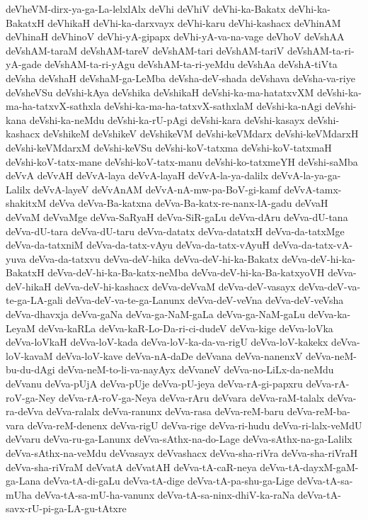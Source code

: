 {deVheVM-dirx-ya-ga-La-lelxlAlx
deVhi
deVhiV
deVhi-ka-Bakatx
deVhi-ka-BakatxH
deVhikaH
deVhi-ka-darxvayx
deVhi-karu
deVhi-kashacx
deVhinAM
deVhinaH
deVhinoV
deVhi-yA-gipapx
deVhi-yA-va-na-vage
deVhoV
deVshAA
deVshAM-taraM
deVshAM-tareV
deVshAM-tari
deVshAM-tariV
deVshAM-ta-ri-yA-gade
deVshAM-ta-ri-yAgu
deVshAM-ta-ri-yeMdu
deVshAa
deVshA-tiVta
deVsha
deVshaH
deVshaM-ga-LeMba
deVsha-deV-shada
deVshava
deVsha-va-riye
deVsheVSu
deVshi-kAya
deVshika
deVshikaH
deVshi-ka-ma-hatatxvXM
deVshi-ka-ma-ha-tatxvX-sathxla
deVshi-ka-ma-ha-tatxvX-sathxlaM
deVshi-ka-nAgi
deVshi-kana
deVshi-ka-neMdu
deVshi-ka-rU-pAgi
deVshi-kara
deVshi-kasayx
deVshi-kashacx
deVshikeM
deVshikeV
deVshikeVM
deVshi-keVMdarx
deVshi-keVMdarxH
deVshi-keVMdarxM
deVshi-keVSu
deVshi-koV-tatxma
deVshi-koV-tatxmaH
deVshi-koV-tatx-mane
deVshi-koV-tatx-manu
deVshi-ko-tatxmeYH
deVshi-saMba
deVvA
deVvAH
deVvA-laya
deVvA-layaH
deVvA-la-ya-dalilx
deVvA-la-ya-ga-Lalilx
deVvA-layeV
deVvAnAM
deVvA-nA-mw-pa-BoV-gi-kamf
deVvA-tamx-shakitxM
deVva
deVva-Ba-katxna
deVva-Ba-katx-re-nanx-lA-gadu
deVvaH
deVvaM
deVvaMge
deVva-SaRyaH
deVva-SiR-gaLu
deVva-dAru
deVva-dU-tana
deVva-dU-tara
deVva-dU-taru
deVva-datatx
deVva-datatxH
deVva-da-tatxMge
deVva-da-tatxniM
deVva-da-tatx-vAyu
deVva-da-tatx-vAyuH
deVva-da-tatx-vA-yuva
deVva-da-tatxvu
deVva-deV-hika
deVva-deV-hi-ka-Bakatx
deVva-deV-hi-ka-BakatxH
deVva-deV-hi-ka-Ba-katx-neMba
deVva-deV-hi-ka-Ba-katxyoVH
deVva-deV-hikaH
deVva-deV-hi-kashacx
deVva-deVvaM
deVva-deV-vasayx
deVva-deV-va-te-ga-LA-gali
deVva-deV-va-te-ga-Lanunx
deVva-deV-veVna
deVva-deV-veVsha
deVva-dhavxja
deVva-gaNa
deVva-ga-NaM-gaLa
deVva-ga-NaM-gaLu
deVva-ka-LeyaM
deVva-kaRLa
deVva-kaR-Lo-Da-ri-ci-dudeV
deVva-kige
deVva-loVka
deVva-loVkaH
deVva-loV-kada
deVva-loV-ka-da-va-rigU
deVva-loV-kakekx
deVva-loV-kavaM
deVva-loV-kave
deVva-nA-daDe
deVvana
deVva-nanenxV
deVva-neM-bu-du-dAgi
deVva-neM-to-li-va-nayAyx
deVvaneV
deVva-no-LiLx-da-neMdu
deVvanu
deVva-pUjA
deVva-pUje
deVva-pU-jeya
deVva-rA-gi-papxru
deVva-rA-roV-ga-Ney
deVva-rA-roV-ga-Neya
deVva-rAru
deVvara
deVva-raM-talalx
deVva-ra-deVva
deVva-ralalx
deVva-ranunx
deVva-rasa
deVva-reM-baru
deVva-reM-ba-vara
deVva-reM-denenx
deVva-rigU
deVva-rige
deVva-ri-hudu
deVva-ri-lalx-veMdU
deVvaru
deVva-ru-ga-Lanunx
deVva-sAthx-na-do-Lage
deVva-sAthx-na-ga-Lalilx
deVva-sAthx-na-veMdu
deVvasayx
deVvashacx
deVva-sha-riVra
deVva-sha-riVraH
deVva-sha-riVraM
deVvatA
deVvatAH
deVva-tA-caR-neya
deVva-tA-dayxM-gaM-ga-Lana
deVva-tA-di-gaLu
deVva-tA-dige
deVva-tA-pa-shu-ga-Lige
deVva-tA-sa-mUha
deVva-tA-sa-mU-ha-vanunx
deVva-tA-sa-ninx-dhiV-ka-raNa
deVva-tA-savx-rU-pi-ga-LA-gu-tAtxre
}
